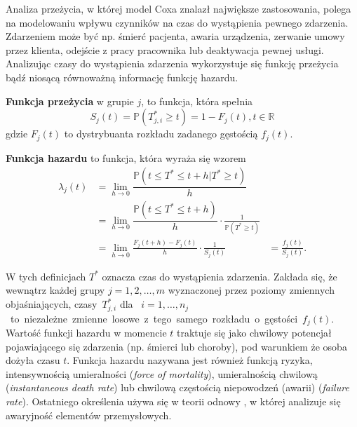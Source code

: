 Analiza przeżycia, w której model Coxa znalazł największe zastosowania, polega na modelowaniu wpływu czynników na czas
do wystąpienia pewnego zdarzenia. Zdarzeniem może być np. śmierć pacjenta, awaria urządzenia, zerwanie umowy przez klienta, odejście z pracy pracownika lub deaktywacja pewnej usługi. Analizując czasy do wystąpienia zdarzenia wykorzystuje się funkcję przeżycia bądź niosącą równoważną informację funkcję hazardu.
\begin{definition}
\textbf{Funkcja przeżycia} w grupie $j$, to funkcja, która spełnia
\begin{equation}
S_j(t) = \mathbb{P}(T^*_{j,i} \geq t )  = 1 - F_j(t), t \in \mathbb{R}
\end{equation}
gdzie $F_j(t)$ to dystrybuanta rozkładu zadanego gęstością $f_j(t)$.
\end{definition}
\begin{definition}\label{def:haz}
\textbf{Funkcja hazardu} to funkcja, która wyraża się wzorem
\begin{equation}
\begin{align*}
\lambda_j(t) & =  \lim\limits_{h\rightarrow 0}\dfrac{\mathbb{P}(t \leq T^* \leq t +h | T^* \geq t)}{h} & \ \\
 \ & = \lim\limits_{h\rightarrow 0}\dfrac{\mathbb{P}(t \leq T^* \leq t +h )}{h}\cdot\frac{1}{  \mathbb{P}(T^* \geq t)} & \ \\ \ & = \lim\limits_{h\rightarrow 0} \frac{F_j(t+h) - F_j(t) }{h}\cdot\frac{1}{S_j(t)} & =  \frac{f_j(t)}{S_j(t)}.
\end{align*}
\end{equation}
\end{definition}

W tych definicjach $T^*$ oznacza czas do wystąpienia zdarzenia. Zakłada się, że wewnątrz każdej grupy $j=1,2,\dots, m$ wyznaczonej przez poziomy zmiennych objaśniających, czasy~$T_{j,i}^*$ dla \ $i=1,\dots,n_j$~to~niezależne~zmienne~losowe~z~tego~samego~rozkładu~o~gęstości~$f_j(t)$.
\newpage
Wartość funkcji hazardu w momencie $t$ traktuje się jako chwilowy potencjał pojawiającego się zdarzenia (np. śmierci lub choroby), pod warunkiem że osoba dożyła czasu $t$. Funkcja hazardu nazywana jest również funkcją ryzyka,
intensywnością umieralności (\textit{force of mortality}), umieralnością
chwilową (\textit{instantaneous death rate}) lub chwilową
częstością niepowodzeń (awarii) (\textit{failure rate}). Ostatniego
określenia używa się w teorii odnowy \cite{cox0}, w której analizuje
się awaryjność elementów przemysłowych. 


